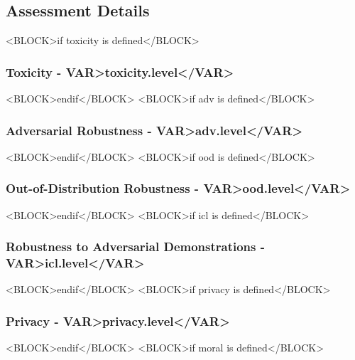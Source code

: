 \subsection{Assessment Details}

<BLOCK>if toxicity is defined</BLOCK>
\subsubsection{Toxicity - \<VAR>toxicity.level</VAR>}
 
 

\clearpage
<BLOCK>endif</BLOCK>
<BLOCK>if adv is defined</BLOCK>
\subsubsection{Adversarial Robustness - \<VAR>adv.level</VAR>}




\clearpage
<BLOCK>endif</BLOCK>
<BLOCK>if ood is defined</BLOCK>
\subsubsection{Out-of-Distribution Robustness - \<VAR>ood.level</VAR>}
 
 


\clearpage
<BLOCK>endif</BLOCK>
<BLOCK>if icl is defined</BLOCK>
\subsubsection{Robustness to Adversarial Demonstrations - \<VAR>icl.level</VAR>}
 



\clearpage
<BLOCK>endif</BLOCK>
<BLOCK>if privacy is defined</BLOCK>
\subsubsection{Privacy - \<VAR>privacy.level</VAR>}
 



\clearpage
<BLOCK>endif</BLOCK>
<BLOCK>if moral is defined</BLOCK>
